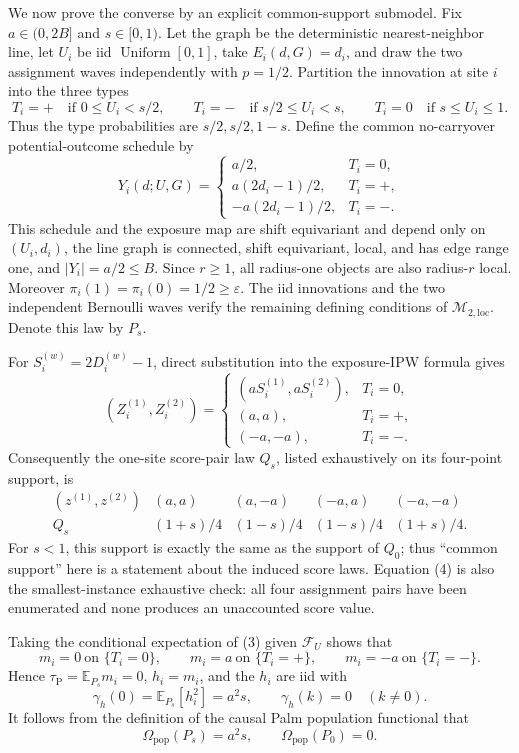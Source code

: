 We now prove the converse by an explicit common-support submodel.  Fix \(a\in(0,2B]\) and \(s\in[0,1)\).  Let the graph be the deterministic nearest-neighbor line, let \(U_i\) be iid \(\operatorname{Uniform}[0,1]\), take \(E_i(d,G)=d_i\), and draw the two assignment waves independently with \(p=1/2\).  Partition the innovation at site \(i\) into the three types
\[
 T_i=+\quad\text{if }0\le U_i<s/2,\qquad
 T_i=-\quad\text{if }s/2\le U_i<s,\qquad
 T_i=0\quad\text{if }s\le U_i\le1.
\]
Thus the type probabilities are \(s/2,s/2,1-s\).  Define the common no-carryover potential-outcome schedule by
\[
 Y_i(d;U,G)=
 \begin{cases}
 a/2,&T_i=0,\\
 a(2d_i-1)/2,&T_i=+,\\
 -a(2d_i-1)/2,&T_i=-.
 \end{cases} \tag{2}
\]
This schedule and the exposure map are shift equivariant and depend only on \((U_i,d_i)\), the line graph is connected, shift equivariant, local, and has edge range one, and \(|Y_i|=a/2\le B\).  Since \(r\ge1\), all radius-one objects are also radius-\(r\) local.  Moreover \(\pi_i(1)=\pi_i(0)=1/2\ge\varepsilon\).  The iid innovations and the two independent Bernoulli waves verify the remaining defining conditions of \(\mathcal M_{2,\mathrm{loc}}\).  Denote this law by \(P_s\).

For \(S_i^{(w)}=2D_i^{(w)}-1\), direct substitution into the exposure-IPW formula gives
\[
 (Z_i^{(1)},Z_i^{(2)})=
 \begin{cases}
 (aS_i^{(1)},aS_i^{(2)}),&T_i=0,\\
 (a,a),&T_i=+,\\
 (-a,-a),&T_i=-.
 \end{cases} \tag{3}
\]
Consequently the one-site score-pair law \(Q_s\), listed exhaustively on its four-point support, is
\[
 \begin{array}{c|cccc}
 (z^{(1)},z^{(2)})&(a,a)&(a,-a)&(-a,a)&(-a,-a)\\ \hline
 Q_s&(1+s)/4&(1-s)/4&(1-s)/4&(1+s)/4.
 \end{array} \tag{4}
\]
For \(s<1\), this support is exactly the same as the support of \(Q_0\); thus ``common support'' here is a statement about the induced score laws.  Equation (4) is also the smallest-instance exhaustive check: all four assignment pairs have been enumerated and none produces an unaccounted score value.

Taking the conditional expectation of (3) given \(\mathcal F_U\) shows that
\[
 m_i=0\ \text{on }\{T_i=0\},\qquad
 m_i=a\ \text{on }\{T_i=+\},\qquad
 m_i=-a\ \text{on }\{T_i=-\}.
\]
Hence \(\tau_{\mathrm P}=\mathbb E_{P_s}m_i=0\), \(h_i=m_i\), and the \(h_i\) are iid with
\[
 \gamma_h(0)=\mathbb E_{P_s}[h_i^2]=a^2s,
 \qquad \gamma_h(k)=0\quad(k\ne0).
\]
It follows from the definition of the causal Palm population functional that
\[
 \Omega_{\mathrm{pop}}(P_s)=a^2s, \qquad
 \Omega_{\mathrm{pop}}(P_0)=0. \tag{5}
\]


